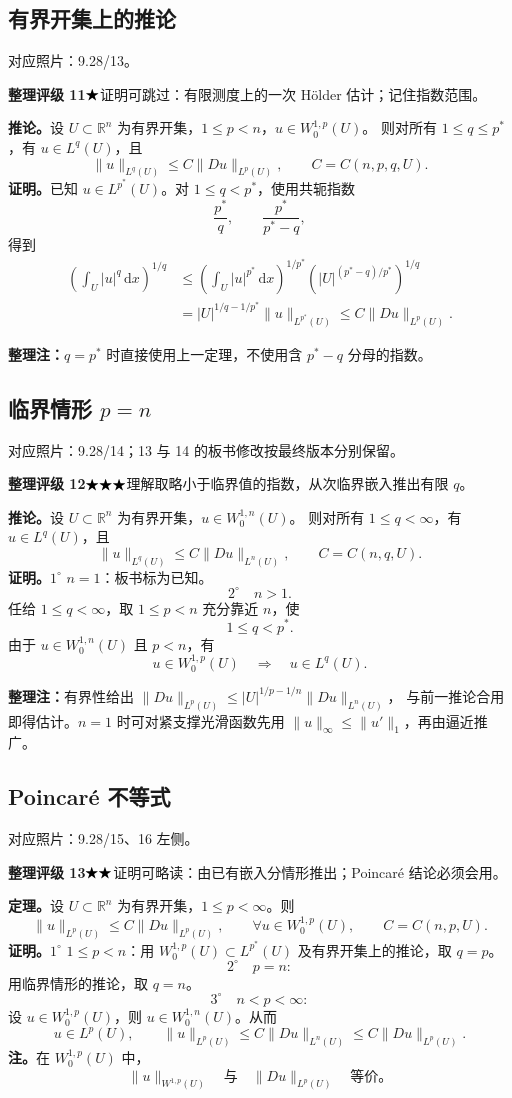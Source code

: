 \documentclass[UTF8,a4paper,11pt,fontset=fandol]{ctexart}
\newcommand{\R}{\mathbb R}
\newcommand{\dd}{\,\mathrm d}
\newcommand{\ednote}[1]{\par{\small\color{notegray}\textbf{整理注：}#1}\par}
\newcommand{\source}[1]{{\small\color{notegray}对应照片：#1。}\par}
\newcommand{\proofstars}[1]{\ensuremath{%
\ifnum#1>0\relax\bigstar\fi
\ifnum#1>1\relax\bigstar\fi
\ifnum#1>2\relax\bigstar\fi
\ifnum#1>3\relax\bigstar\fi
\ifnum#1>4\relax\bigstar\fi}}
\newcommand{\proofrating}[3]{\par{\small\color{proofblue}%
\textbf{整理评级 #1}\enspace\proofstars{#2}\quad #3\par}}
\begin{document}
\subsection*{有界开集上的推论}
\source{9.28/13}
\proofrating{11}{1}{证明可跳过：有限测度上的一次 Hölder 估计；记住指数范围。}
\textbf{推论。}设 $U\subset\R^n$ 为有界开集，$1\leq p<n$，$u\in W_0^{1,p}(U)$。
则对所有 $1\leq q\leq p^*$，有 $u\in L^q(U)$，且
\[
\|u\|_{L^q(U)}\leq C\|Du\|_{L^p(U)},\qquad C=C(n,p,q,U).
\]
\textbf{证明。}已知 $u\in L^{p^*}(U)$。对 $1\leq q<p^*$，使用共轭指数
\[
\frac{p^*}{q},\qquad \frac{p^*}{p^*-q},
\]
得到
\[
\begin{aligned}
\left(\int_U|u|^q\dd x\right)^{1/q}
&\leq\left(\int_U|u|^{p^*}\dd x\right)^{1/p^*}
\left(|U|^{(p^*-q)/p^*}\right)^{1/q}\\
&=|U|^{1/q-1/p^*}\|u\|_{L^{p^*}(U)}
\leq C\|Du\|_{L^p(U)}.
\end{aligned}
\]
\ednote{$q=p^*$ 时直接使用上一定理，不使用含 $p^*-q$ 分母的指数。}

\subsection*{临界情形 $p=n$}
\source{9.28/14；13 与 14 的板书修改按最终版本分别保留}
\proofrating{12}{3}{理解取略小于临界值的指数，从次临界嵌入推出有限 $q$。}
\textbf{推论。}设 $U\subset\R^n$ 为有界开集，$u\in W_0^{1,n}(U)$。
则对所有 $1\leq q<\infty$，有 $u\in L^q(U)$，且
\[
\|u\|_{L^q(U)}\leq C\|Du\|_{L^n(U)},\qquad C=C(n,q,U).
\]
\textbf{证明。}$1^\circ$ $n=1$：板书标为已知。
\[
2^\circ\quad n>1.
\]
任给 $1\leq q<\infty$，取 $1\leq p<n$ 充分靠近 $n$，使
\[
1\leq q<p^*.
\]
由于 $u\in W_0^{1,n}(U)$ 且 $p<n$，有
\[
u\in W_0^{1,p}(U)\quad\Longrightarrow\quad u\in L^q(U).
\]
\ednote{有界性给出
$\|Du\|_{L^p(U)}\leq|U|^{1/p-1/n}\|Du\|_{L^n(U)}$，
与前一推论合用即得估计。$n=1$ 时可对紧支撑光滑函数先用
$\|u\|_\infty\leq\|u'\|_1$，再由逼近推广。}

\newpage
\subsection{Poincaré 不等式}
\source{9.28/15、16 左侧}
\proofrating{13}{2}{证明可略读：由已有嵌入分情形推出；Poincaré 结论必须会用。}
\textbf{定理。}设 $U\subset\R^n$ 为有界开集，$1\leq p<\infty$。则
\[
\boxed{\|u\|_{L^p(U)}\leq C\|Du\|_{L^p(U)},\qquad
\forall u\in W_0^{1,p}(U),}
\qquad C=C(n,p,U).
\]
\textbf{证明。}$1^\circ$ $1\leq p<n$：用 $W_0^{1,p}(U)\subset L^{p^*}(U)$
及有界开集上的推论，取 $q=p$。
\[
2^\circ\quad p=n:
\]
用临界情形的推论，取 $q=n$。
\[
3^\circ\quad n<p<\infty:
\]
设 $u\in W_0^{1,p}(U)$，则 $u\in W_0^{1,n}(U)$。从而
\[
u\in L^p(U),\qquad
\|u\|_{L^p(U)}\leq C\|Du\|_{L^n(U)}
\leq C\|Du\|_{L^p(U)}.
\]
\textbf{注。}在 $W_0^{1,p}(U)$ 中，
\[
\|u\|_{W^{1,p}(U)}\quad\text{与}\quad\|Du\|_{L^p(U)}
\quad\text{等价。}
\]
\end{document}
